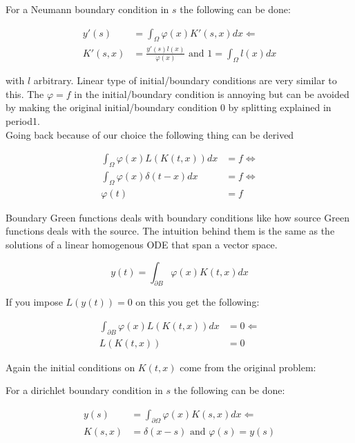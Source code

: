 \documentclass[a4paper,12pt]{article}
\begin{document}
For a Neumann boundary condition in $s$ the following can be done:

\begin{align*}
    y'(s)   & = \int_{\Omega} \varphi(x) K'(s,x)dx \Leftarrow                      \\
    K'(s,x) & = \frac{y'(s) l(x)}{\varphi(x)} \text{ and } 1 = \int_{\Omega}l(x)dx
\end{align*}

with $l$ arbitrary. Linear type of initial/boundary conditions are very similar to this.
The $\varphi = f$ in the initial/boundary condition is annoying but can be avoided
by making the original initial/boundary condition $0$ by splitting explained in period1.\\

Going back because of our choice the following thing can be derived

\begin{align*}
    \int_{\Omega} \varphi(x) L \left(K(t,x) \right)dx & = f \Leftrightarrow \\
    \int_{\Omega} \varphi(x) \delta(t-x)dx            & = f \Leftrightarrow \\
    \varphi(t)                                        & = f
\end{align*}

Boundary Green functions deals with boundary conditions like how source Green functions deals with the source. The intuition behind them is the same as the solutions of a linear homogenous ODE that span a vector space.

$$
    y(t)= \int_{\partial B} \varphi(x) K(t,x) dx
$$

If you impose $L(y(t)) = 0$ on this you get the following:

\begin{align*}
    \int_{\partial B} \varphi(x) L(K(t,x)) dx & = 0 \Leftarrow \\
    L(K(t,x))                                 & = 0
\end{align*}

Again the initial conditions on $K(t,x)$ come from the original problem:

For a dirichlet boundary condition in $s$ the following can be done:

\begin{align*}
    y(s)   & = \int_{\partial \Omega} \varphi(x) K(s,x)dx \Leftarrow \\
    K(s,x) & = \delta(x-s) \text{ and } \varphi(s)= y(s)
\end{align*}
\end{document}

